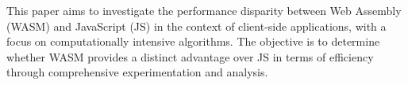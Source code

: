 This paper aims to investigate the performance disparity between Web Assembly (WASM) and JavaScript (JS) in the context of client-side applications, with a focus on computationally intensive algorithms. The objective is to determine whether WASM provides a distinct advantage over JS in terms of efficiency through comprehensive experimentation and analysis.